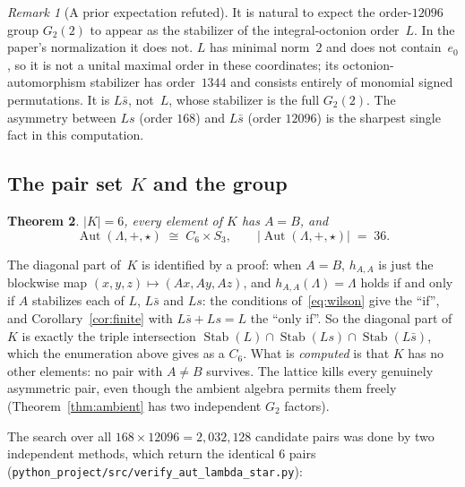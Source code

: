 \documentclass[11pt]{amsart}
\newcommand{\LL}{\Lambda}
\DeclareMathOperator{\Aut}{Aut}
\DeclareMathOperator{\Stab}{Stab}
\newtheorem{theorem}{Theorem}
\theoremstyle{definition}
\theoremstyle{remark}
\newtheorem{remark}[theorem]{Remark}
\begin{document}
\begin{remark}[A prior expectation refuted]\label{rem:12096}
It is natural to expect the order-$12096$ group $G_2(2)$ to appear as the
stabilizer of the integral-octonion order~$L$. In the paper's normalization it
does not. $L$ has minimal norm~$2$ and does not contain~$e_0$, so it is not a
unital maximal order in these coordinates; its octonion-automorphism
stabilizer has order~$1344$ and consists entirely of monomial signed
permutations. It is $L\bar s$, not~$L$, whose stabilizer is the full
$G_2(2)$. The asymmetry between $Ls$ (order $168$) and $L\bar s$ (order
$12096$) is the sharpest single fact in this computation.
\end{remark}

\subsection{The pair set $K$ and the group}

\begin{theorem}\label{thm:main}
$|K| = 6$, every element of $K$ has $A = B$, and
\[
  \Aut(\LL, +, \star) \;\cong\; C_6 \times S_3, \qquad
  \bigl|\Aut(\LL,+,\star)\bigr| \;=\; 36 .
\]
\end{theorem}

The diagonal part of~$K$ is identified by a proof: when $A = B$, $h_{A,A}$ is
just the blockwise map $(x,y,z) \mapsto (Ax,Ay,Az)$, and
$h_{A,A}(\LL) = \LL$ holds if and only if $A$ stabilizes each of $L$,
$L\bar s$ and $Ls$: the conditions of~\eqref{eq:wilson} give the ``if'', and
Corollary~\ref{cor:finite} with $L\bar s + Ls = L$ the ``only if''. So the diagonal part of $K$ is
exactly the triple intersection $\Stab(L) \cap \Stab(Ls) \cap \Stab(L\bar s)$,
which the enumeration above gives as a $C_6$. What is \emph{computed} is that
$K$ has no other elements: no pair with $A \neq B$ survives. The lattice kills
every genuinely asymmetric pair, even though the ambient algebra permits them
freely (Theorem~\ref{thm:ambient} has two independent $G_2$ factors).

The search over all $168 \times 12096 = 2{,}032{,}128$ candidate pairs was done
by two independent methods, which return the identical $6$ pairs
(\texttt{python\_project/src/verify\_aut\_lambda\_star.py}):
\end{document}
